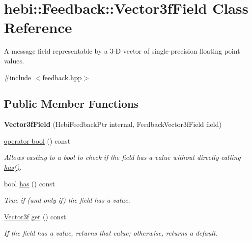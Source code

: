 \hypertarget{classhebi_1_1Feedback_1_1Vector3fField}{}\section{hebi\+:\+:Feedback\+:\+:Vector3f\+Field Class Reference}
\label{classhebi_1_1Feedback_1_1Vector3fField}


A message field representable by a 3-\/D vector of single-\/precision floating point values.  




{\ttfamily \#include $<$feedback.\+hpp$>$}

\subsection*{Public Member Functions}
\begin{DoxyCompactItemize}
\item 
\mbox{\label{classhebi_1_1Feedback_1_1Vector3fField_ab8f283eb2c0b88ddc08df740233a7d50}} 
{\bfseries Vector3f\+Field} (Hebi\+Feedback\+Ptr internal, Feedback\+Vector3f\+Field field)
\item 
\hyperlink{classhebi_1_1Feedback_1_1Vector3fField_a236d1c0aee3fea79769c9da36f1e1fbb}{operator bool} () const
\begin{DoxyCompactList}\small\item\em Allows casting to a bool to check if the field has a value without directly calling {\ttfamily \hyperlink{classhebi_1_1Feedback_1_1Vector3fField_a0484daa9aba07fe04f80467bf6501b0e}{has()}}. \end{DoxyCompactList}\item 
\mbox{\label{classhebi_1_1Feedback_1_1Vector3fField_a0484daa9aba07fe04f80467bf6501b0e}} 
bool \hyperlink{classhebi_1_1Feedback_1_1Vector3fField_a0484daa9aba07fe04f80467bf6501b0e}{has} () const
\begin{DoxyCompactList}\small\item\em True if (and only if) the field has a value. \end{DoxyCompactList}\item 
\mbox{\label{classhebi_1_1Feedback_1_1Vector3fField_aca87a6c29cb168011bb81e18b30aa83e}} 
\hyperlink{structhebi_1_1Vector3f}{Vector3f} \hyperlink{classhebi_1_1Feedback_1_1Vector3fField_aca87a6c29cb168011bb81e18b30aa83e}{get} () const
\begin{DoxyCompactList}\small\item\em If the field has a value, returns that value; otherwise, returns a default. \end{DoxyCompactList}\end{DoxyCompactItemize}



